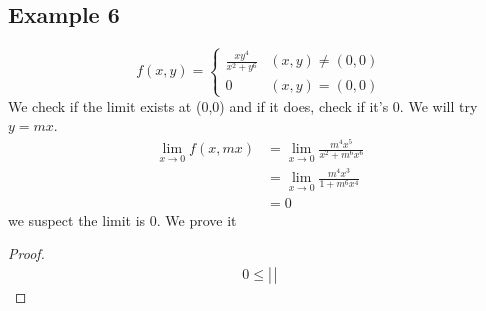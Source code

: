 \documentclass[12pt]{article}
\theoremstyle{definition}
\begin{document}
\subsection*{Example 6}
\[f(x,y)=\begin{cases}\frac{xy^4}{x^2+y^6}&(x,y)\neq (0,0)\\0&(x,y)=(0,0)\end{cases}\]
We check if the limit exists at (0,0) and if it does, check if it's 0. We will try $y=mx$.
\begin{align*}
    \lim_{x\to 0}f(x,mx)&=\lim_{x\to 0}\frac{m^4x^5}{x^2+m^6x^6}\\
    &=\lim_{x\to 0}\frac{m^4x^3}{1+m^6x^4}\\
    &=0
\end{align*}
we suspect the limit is 0. We prove it 
\begin{proof}
    \begin{align*}
        0\leq \left|\frac{}{} \right|
    \end{align*}
\end{proof}
\end{document}
